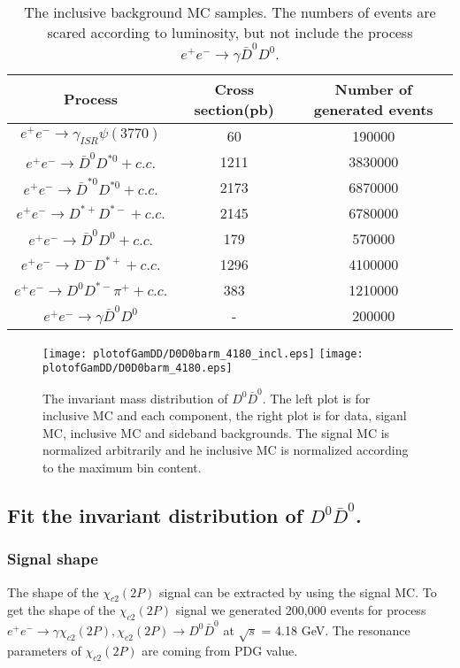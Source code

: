 \documentclass[aps,preprint,tightenlines,superscriptaddress,showpacs,byrevtex,amsmath,amssymb,nofloatfix]{revtex4}
\begin{document}
 \begin{table}[!htbp]
\caption{The inclusive background MC samples. The numbers of events are scared according to luminosity, but not include the process $e^{+}e^{-}\rightarrow \gamma \bar{D}^{0}D^{0}$.}
\label{background_table_D0}
\begin{tabular}{|c|c|c|}
  \hline
  Process &   Cross section(pb)    & Number of generated events  \\
  \hline
  $e^{+}e^{-}\rightarrow \gamma_{ISR} \psi(3770)$ & 60  & 190000  \\
  $e^{+}e^{-}\rightarrow \bar{D}^{0}D^{*0}+c.c.$  &  1211  &3830000  \\
  $e^{+}e^{-}\rightarrow \bar{D}^{*0}D^{*0}+c.c.$ &  2173  &6870000  \\
  $e^{+}e^{-}\rightarrow D^{*+}D^{*-}+c.c.$       &  2145  & 6780000     \\
  $e^{+}e^{-}\rightarrow \bar{D}^{0}D^{0}+c.c.$   & 179  &  570000  \\
  $e^{+}e^{-}\rightarrow D^{-}D^{*+}+c.c.$        &  1296  &4100000      \\
   $e^{+}e^{-}\rightarrow D^{0}D^{*-}\pi^{+}+c.c.$ & 383 & 1210000 \\
  $e^{+}e^{-}\rightarrow \gamma \bar{D}^{0}D^{0}$ & -  &200000 \\
  \hline
\end{tabular}
\end{table}


\begin{figure}[!htbp]
\captionsetup{justification=raggedright}
    \texttt{[image: plotofGamDD/D0D0barm\_4180\_incl.eps]}
    \texttt{[image: plotofGamDD/D0D0barm\_4180.eps]}
  \caption{\small The invariant mass distribution of $D^{0}\bar{D}^{0}$.  The left plot is for inclusive MC and each component, the right plot is for data, siganl MC, inclusive MC and sideband backgrounds. The signal MC is normalized arbitrarily and he inclusive MC is normalized according to the maximum bin content.}
  \label{mDDbar_4180}
\end{figure}

\subsection{Fit the invariant distribution of $D^{0}\bar{D}^{0}$.}

\subsubsection{Signal shape}
The shape of the $\chi_{c2}(2P)$ signal can be extracted by using the signal MC. To get the shape of the $\chi_{c2}(2P)$ signal we generated 200,000 events for process $e^{+}e^{-} \rightarrow \gamma \chi_{c2}(2P), \chi_{c2}(2P) \rightarrow D^{0}\bar{D}^{0}$ at $\sqrt{s}$ = 4.18 GeV. The resonance parameters of $\chi_{c2}(2P)$ are coming from PDG value.
\end{document}
